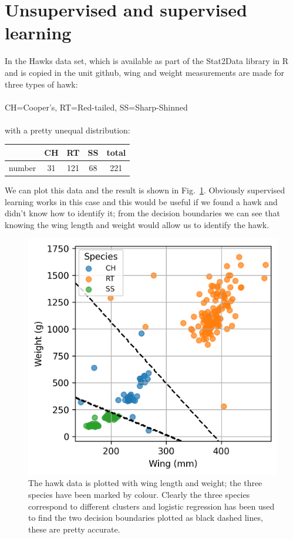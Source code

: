 \documentclass[12pt]{article}
\begin{document}
\section*{Unsupervised and supervised learning}

In the Hawks data set, which is available as part of the Stat2Data
library in R and is copied in the unit github, wing and weight measurements are made for three types of hawk:\\
\\
CH=Cooper's, RT=Red-tailed, SS=Sharp-Shinned\\
\\
with a pretty unequal distribution:
\begin{center}
  
\begin{tabular}{l|cccc}
  &CH&RT&SS&total\\
  \hline
  number&31&121&68&221
  \end{tabular}
\end{center}
We can plot this data and the result is shown in Fig.~\ref{fig:hawks_plot}. Obviously supervised learning works in this case and this would be useful if we found a hawk and didn't know how to identify it; from the decision boundaries we can see that knowing the wing length and weight would allow us to identify the hawk.

\begin{figure}[htb]
\begin{center}  
  \includegraphics{hawks_plot.png}
\end{center}
\caption{The hawk data is plotted with wing length and weight; the three species have been marked by colour. Clearly the three species correspond to different clusters and logistic regression has been used to find the two decision boundaries plotted as black dashed lines, these are pretty accurate.\label{fig:hawks_plot}}
\end{figure}
\end{document}
